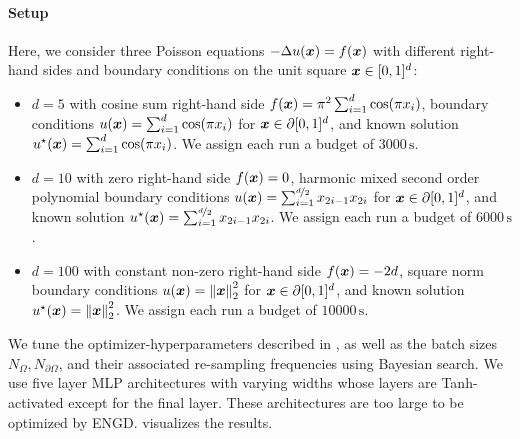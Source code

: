 \paragraph{Setup} Here, we consider three Poisson equations $- \Delta u({\bm{x}}) = f({\bm{x}})$ with different right-hand sides and boundary conditions on the unit square ${\bm{x}} \in [0, 1]^d$:
\begin{itemize}
\item $d=5$ with cosine sum right-hand side $f({\bm{x}}) = \pi^2 \sum_{i=1}^d \cos(\pi {x}_i)$, boundary conditions $u({\bm{x}}) = \sum_{i=1}^d \cos(\pi {x}_i)$ for ${\bm{x}} \in \partial [0,1]^d$, and known solution $u^{\star}({\bm{x}}) = \sum_{i=1}^d \cos(\pi {x}_i)$.
  We assign each run a budget of $\num{3000}\,\text{s}$.

\item $d=10$ with zero right-hand side $f({\bm{x}}) = 0$, harmonic mixed second order polynomial boundary conditions $u({\bm{x}}) = \sum_{i=1}^{\nicefrac{d}{2}} {x}_{2i-1} {x}_{2i}$ for ${\bm{x}} \in \partial [0,1]^d$, and known solution $u^{\star}({\bm{x}}) =  \sum_{i=1}^{\nicefrac{d}{2}} {x}_{2i-1} {x}_{2i}$.
  We assign each run a budget of $\num{6000}\,\text{s}$.

\item $d=100$ with constant non-zero right-hand side $f({\bm{x}}) = -2 d$, square norm boundary conditions $u({\bm{x}}) = \left\lVert {\bm{x}} \right\rVert_2^2$ for ${\bm{x}} \in \partial [0,1]^d$, and known solution $u^{\star}({\bm{x}}) =  \left\lVert {\bm{x}} \right\rVert_2^2$.
  We assign each run a budget of $\num{10000}\,\text{s}$.
\end{itemize}
We tune the optimizer-hyperparameters described in , as well as the batch sizes $N_{\Omega}, N_{\partial \Omega}$, and their associated re-sampling frequencies using Bayesian search.
We use five layer MLP architectures with varying widths whose layers are Tanh-activated except for the final layer.
These architectures are too large to be optimized by ENGD.
 visualizes the results.

